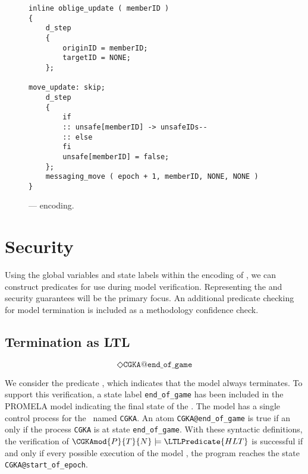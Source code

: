 \begin{figure}[ht!]
  \centering
  \caption{\label{fig:Oracle-Update}\CGKAmod{}{}{} ---  encoding.}
\begin{verbatim}
inline oblige_update ( memberID )
{
    d_step
    {
        originID = memberID;
        targetID = NONE;
    };

move_update: skip;
    d_step
    {
        if
        :: unsafe[memberID] -> unsafeIDs--
        :: else
        fi
        unsafe[memberID] = false;
    };
    messaging_move ( epoch + 1, memberID, NONE, NONE )
}
\end{verbatim}
\end{figure}


\hypertarget{sec:LTL-security}{%
\section{Security}\label{sec:LTL-security}}

Using the global variables and state labels within the encoding of , we can construct  predicates for use during model verification.
Representing the  and  security guarantees will be the primary focus.
An additional predicate checking for model termination is included as a methodology confidence check.


\hypertarget{sec:hlt-as-ltl}{%
\subsection{Termination as LTL}\label{sec:hlt-as-ltl}}

\begin{LTL}
\[
    \Diamond \texttt{CGKA@end\_of\_game}
\]
\end{LTL}

We consider the  predicate , which indicates that the  model always terminates.
To support this verification, a state label \texttt{end\_of\_game} has been included in the PROMELA model indicating the final state of the \CGKAsec. 
The model has a single control process for the \CGKAsec\ named \texttt{CGKA}.
An  atom \texttt{CGKA@end\_of\_game} is true if an only if the process \texttt{CGKA} is at state \texttt{end\_of\_game}.
With these syntactic definitions, the verification of \(\CGKAmod{P}{T}{N} \models \LTLPredicate{HLT} \) is successful if and only if every possible execution of the model \CGKAmod{}{}{}, the program reaches the state \texttt{CGKA@start\_of\_epoch}.


